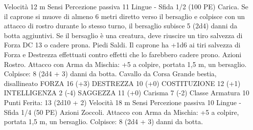 \begin{multicols}{2}
Velocità 12 m
Sensi Percezione passiva 11
Lingue -
Sfida 1/2 (100 PE)
Carica. Se il caprone si muove di almeno 6 metri diretto verso il
bersaglio e colpisce con un attacco di rostro durante lo stesso
turno, il bersaglio subisce 5 (2d4) danni da botta aggiuntivi.
Se il bersaglio è una creatura, deve riuscire un tiro salvezza di
Forza DC 13 o cadere prona.
Piedi Saldi. Il caprone ha +1d6 ai tiri salvezza di Forza e
Destrezza effettuati contro effetti che lo farebbero cadere prono.
Azioni
Rostro. Attacco con Arma da Mischia: +5 a colpire, portata 1,5
m, un bersaglio.
Colpisce: 8 (2d4 + 3) danni da botta.
Cavallo da Corsa
Grande bestia, disallineato
FORZA 16 (+3)
DESTREZZA 10 (+0)
COSTITUZIONE 12 (+1)
INTELLIGENZA 2 (-4)
SAGGEZZA 11 (+0)
Carisma 7 (-2)
Classe Armatura 10
\hspace*{0pt}\hfill{Punti Ferita}: 13 (2d10 + 2)
Velocità 18 m
Sensi Percezione passiva 10
Lingue -
Sfida 1/4 (50 PE)
Azioni
Zoccoli. Attacco con Arma da Mischia: +5 a colpire, portata 1,5
m, un bersaglio.
Colpisce: 8 (2d4 + 3) danni da botta. 
 

\end{multicols}
